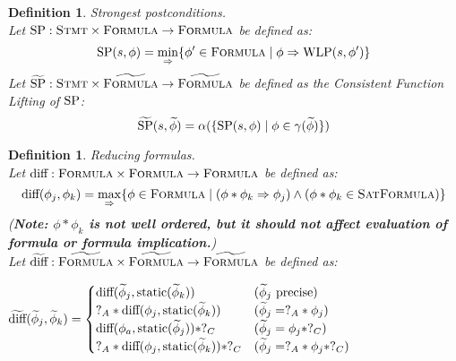 \documentclass {article}
\newtheorem{definition}[theorem]{Definition}
\newcommand{\tphi}{\widetilde{\phi}}
\newcommand{\imp}{\Rightarrow}
\newcommand{\wlp}[2]{\textup{WLP}(#1,#2)}
\newcommand{\static}[1]{\textup{static}(#1)}
\newcommand{\diff}[2]{\textup{diff}(#1,#2)}
\newcommand{\tdiff}[2]{\widetilde{\textup{diff}}(#1,#2)}
\newcommand{\satdef}{\textsc{SatFormula}}
\newcommand{\formula}{\textsc{Formula}}
\newcommand{\gradformula}{\widetilde{\textsc{Formula}}}
\begin{document}
\vspace{5mm}
\begin{definition} Strongest postconditions.\\
Let $\textup{SP} : \textsc{Stmt} \times \formula \rightarrow \formula$ be defined as: 
$$\textup{SP}(s, \phi) = \min_{\imp}\{\phi' \in \formula \mid \phi \imp \wlp{s}{\phi'} \}$$
Let $\widetilde{\textup{SP}}: \textsc{Stmt} \times \gradformula \rightarrow \gradformula$ be defined as the Consistent Function Lifting of $\textup{SP}$:
$$\widetilde{\textup{SP}}(s, \tphi) = \alpha(\{\textup{SP}(s,\phi) \mid \phi \in \gamma(\tphi)\})$$

\end{definition}
\vspace{5mm}
\begin{definition} Reducing formulas.\\
Let $\textup{diff} : \formula \times \formula \rightarrow \formula$ be defined as: 
$$\textup{diff}(\phi_j,\phi_k)=\max_{\imp}\{\phi \in \formula \mid (\phi \ast \phi_k \imp \phi_j) \wedge (\phi \ast \phi_k \in \satdef) \}$$
(\textbf{Note: $\phi \ast \phi_k$ is not well ordered, but it should not affect evaluation of formula or formula implication.})\\
Let $\widetilde{\text{diff}} : \gradformula \times \gradformula \rightarrow \gradformula$ be defined as:
\begin{center}
$  \tdiff{\tphi_j}{\tphi_k} = 
\begin{cases}
	 \diff{\tphi_j}{\static{\tphi_k}} & (\tphi_j\text{ precise})\\
	 ?_A \ast \diff{\phi_j}{\static{\tphi_k}} & (\tphi_j = ?_A \ast \phi_j)\\
	 \diff{\phi_a}{\static{\tphi_j}} \ast ?_C & (\tphi_j = \phi_j \ast ?_C)\\
	 ?_A \ast \diff{\phi_j}{\static{\tphi_k}} \ast ?_C& (\tphi_j = ?_A \ast \phi_j \ast ?_C)\\
\end{cases}
$
\end{center}
\end{definition}
\end{document}
